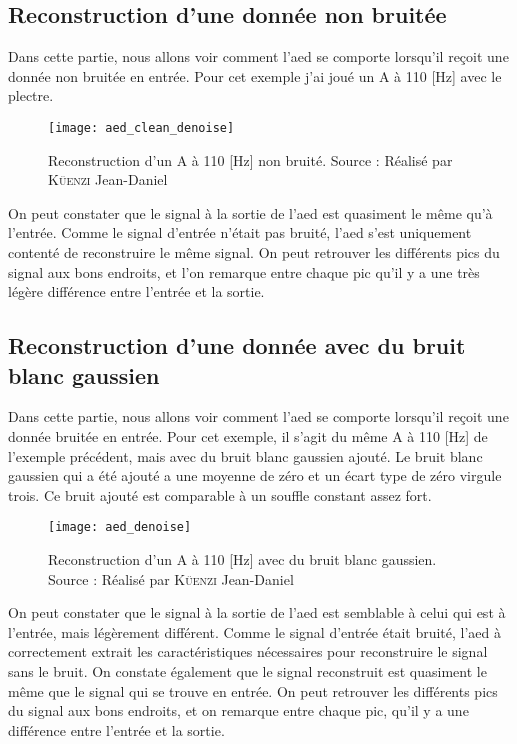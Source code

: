 \subsection{Reconstruction d'une donnée non bruitée}

Dans cette partie, nous allons voir comment l'\gls{aed} se comporte lorsqu'il reçoit une donnée non bruitée en entrée. Pour cet exemple j'ai joué un A à 110 [Hz] avec le plectre.

\begin{figure}[H]
	\centering
	\texttt{[image: aed\_clean\_denoise]}
	\caption[Reconstruction d'un A à 110 Hertz non bruité]{Reconstruction d'un A à 110 [Hz] non bruité. Source : Réalisé par \textsc{Küenzi} Jean-Daniel}
	\label{fig:aed_clean_denoise}
\end{figure}

On peut constater que le signal à la sortie de l'\gls{aed} est quasiment le même qu'à l'entrée. Comme le signal d'entrée n'était pas bruité, l'\gls{aed} s'est uniquement contenté de reconstruire le même signal. On peut retrouver les différents pics du signal aux bons endroits, et l’on remarque entre chaque pic qu'il y a une très légère différence entre l'entrée et la sortie.

\subsection{Reconstruction d'une donnée avec du bruit blanc gaussien}

Dans cette partie, nous allons voir comment l'\gls{aed} se comporte lorsqu'il reçoit une donnée bruitée en entrée. Pour cet exemple, il s'agit du même A à 110 [Hz] de l'exemple précédent, mais avec du bruit blanc gaussien ajouté. Le bruit blanc gaussien qui a été ajouté a une moyenne de zéro et un écart type de zéro virgule trois. Ce bruit ajouté est comparable à un souffle constant assez fort.

\begin{figure}[H]
	\centering
	\texttt{[image: aed\_denoise]}
	\caption[Reconstruction d'un A à 110 Hertz avec du bruit blanc gaussien]{Reconstruction d'un A à 110 [Hz] avec du bruit blanc gaussien. Source : Réalisé par \textsc{Küenzi} Jean-Daniel}
	\label{fig:aed_denoise}
\end{figure}

On peut constater que le signal à la sortie de l'\gls{aed} est semblable à celui qui est à l'entrée, mais légèrement différent. Comme le signal d'entrée était bruité, l'\gls{aed} à correctement extrait les caractéristiques nécessaires pour reconstruire le signal sans le bruit. On constate également que le signal reconstruit est quasiment le même que le signal qui se trouve en entrée. On peut retrouver les différents pics du signal aux bons endroits, et on remarque entre chaque pic, qu'il y a une différence entre l'entrée et la sortie.

